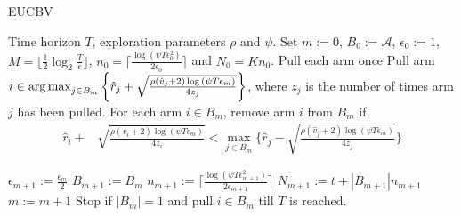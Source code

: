 
\begin{algorithm}[!h]
\caption{EUCBV}
\label{alg:eucbv}
\begin{algorithmic}
 Time horizon $T$, exploration parameters $\rho$ and $\psi$.
 Set $m:=0$, $B_{0}:=\mathcal{A}$, $\epsilon_{0}:=1$, $M=\big \lfloor \frac{1}{2}\log_{2} \frac{T}{e}\big\rfloor$, $n_{0}=\big\lceil\frac{\log{(\psi T\epsilon_{0}^{2})}}{2\epsilon_{0}}\big\rceil$ and  $N_{0}=Kn_{0}$.
\State Pull each arm once
\State Pull arm $i\in \operatorname*{arg\,max}_{j\in B_{m}}\bigg\lbrace \hat{r}_{j} + \sqrt{\frac{\rho(\hat{v}_{j}+2)\log{(\psi T\epsilon_{m})}}{4 z_{j}}} \bigg\rbrace$, where $z_j$ is the number of times arm $j$ has been pulled.
\ArmElim
\State For each arm $i \in B_{m}$, remove arm $i$ from $B_{m}$ if,
\begin{align*}
 \hat{r}_{i} + & \sqrt{\frac{\rho(\hat{v}_{i}+2)\log{(\psi T\epsilon_{m})}}{4 z_{i}}}  
  < \max_{{j}\in B_{m}}\bigg\lbrace\hat{r}_{j} -\sqrt{\frac{\rho(\hat{v}_{j}+2)\log{(\psi T\epsilon_{m})}}{4 z_{j}}} \bigg\rbrace
\end{align*}
\EndArmElim

\ResParam
\State $\epsilon_{m+1}:=\frac{\epsilon_{m}}{2}$\vspace{0.5ex}
\State $B_{m+1}:=B_{m}$
\State $n_{m+1}:=\bigg\lceil\frac{\log{(\psi T\epsilon_{m+1}^{2})}}{2\epsilon_{m+1}}\bigg\rceil$
\State $N_{m+1}:=t+|B_{m+1}| n_{m+1}$
\State $m:=m+1$
\EndResParam
\EndIf
\State Stop if $|B_{m}|=1$ and pull ${i}\in B_{m}$ till $T$ is reached.
\EndFor
\end{algorithmic}
\end{algorithm}

